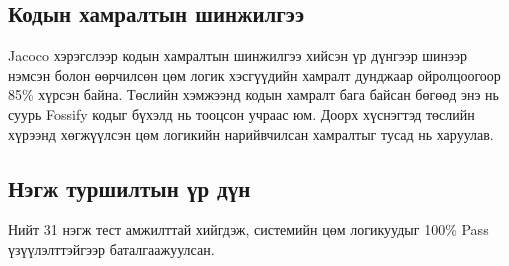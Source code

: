 \subsection{Кодын хамралтын шинжилгээ}
Jacoco хэрэгслээр кодын хамралтын шинжилгээ хийсэн үр дүнгээр шинээр нэмсэн болон өөрчилсөн цөм логик хэсгүүдийн хамралт дунджаар ойролцоогоор 85\% хүрсэн байна. Төслийн хэмжээнд кодын хамралт бага байсан бөгөөд энэ нь суурь Fossify кодыг бүхэлд нь тооцсон учраас юм. Доорх хүснэгтэд төслийн хүрээнд хөгжүүлсэн цөм логикийн нарийвчилсан хамралтыг тусад нь харуулав.
\begin{table}[H]
    \centering
    \caption{Цөм логикийн кодын хамралтын шинжилгээ}
    \label{table:coverage_detail}
\end{table}

\subsection{Нэгж туршилтын үр дүн}
Нийт 31 нэгж тест амжилттай хийгдэж, системийн цөм логикуудыг 100\% Pass үзүүлэлттэйгээр баталгаажуулсан.


